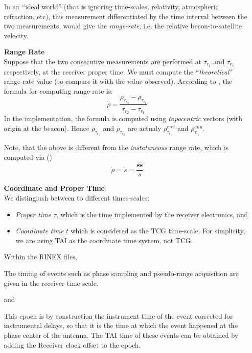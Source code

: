 In an ``ideal world'' (that is ignoring time-scales, relativity, atmospheric 
refraction, etc), this measurement differentiated by the time interval between the 
two measurements, would give the \emph{range-rate}, i.e. the relative becon-to-satellite 
velocity.

\textbf{Range Rate}\\
\label{range-rate}
Suppose that the two consecutive measurements are performed at $\tau_{r_1}$ 
and $\tau_{r_2}$ respectively, at the receiver proper time. We must compute the 
``\emph{theoretical}'' range-rate value (to compare it with the value observed).
According to \cite{Montenbruck2000}, the formula for computing range-rate is:
\begin{equation}
  \dot{\rho} = \frac{\rho_{\tau_{r_2}} - \rho_{\tau_{r_1}}}{\tau_{r_2} - \tau_{r_1}}
\end{equation}
In the implementation, the formula is computed using \emph{topocentric} vectors 
(with origin at the beacon). Hence $\rho_{\tau_{r_1}}$ and $\rho_{\tau_{r_2}}$ are 
actualy $\rho_{\tau_{r_1}}^{enu}$ and $\rho_{\tau_{r_2}}^{enu}$.

Note, that the above is different from the \emph{instataneous} range rate, 
which is computed via (\cite{Montenbruck2000})
\begin{equation}
  \dot{\rho} = \dot{s} = \frac{\bm{s} \bm{\dot{s}}}{s}
\end{equation}

\textbf{Coordinate and Proper Time}\\
\label{coordinate-and-proper-time}
We distingiush between to different times-scales:
\begin{itemize}
  \item \emph{Proper time} $\tau$, which is the time implemented by the receiver 
    electronics, and
  \item \emph{Coordinate time} $t$ which is considered as the TCG time-scale.
  {\color{brown}For simplicity, we are using TAI as the coordinate time system, not TCG.}
\end{itemize}
Within the RINEX files,
\begin{displayquote}
  The timing of events such as phase sampling and pseudo-range acquisition are 
  given in the receiver time scale.
\end{displayquote}
and
\begin{displayquote}
  This epoch is by construction the instrument time of the event corrected for 
  instrumental delays, so that it is the time at which the event happened at the 
  phase center of the antenna.
  The TAI time of these events can be obtained by adding the Receiver clock 
  offset to the epoch.
\end{displayquote}

